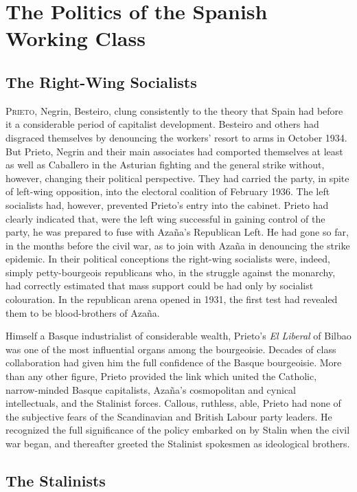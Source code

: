 \chapter{The Politics of the Spanish Working Class}

\section{The Right-Wing Socialists}

\textsc{Prieto}, Negrin, Besteiro, clung consistently to the theory that Spain had before it a considerable period of capitalist development. Besteiro and others had disgraced themselves by denouncing the workers’ resort to arms in October 1934. But Prieto, Negrin and their main associates had comported themselves at least as well as Caballero in the Asturian fighting and the general strike without, however, changing their political perspective. They had carried the party, in spite of left-wing opposition, into the electoral coalition of February 1936. The left socialists had, however, prevented Prieto’s entry into the cabinet. Prieto had clearly indicated that, were the left wing successful in gaining control of the party, he was prepared to fuse with Azaña’s Republican Left. He had gone so far, in the months before the civil war, as to join with Azaña in denouncing the strike epidemic. In their political conceptions the right-wing socialists were, indeed, simply petty-bourgeois republicans who, in the struggle against the monarchy, had correctly estimated that mass support could be had only by socialist colouration. In the republican arena opened in 1931, the first test had revealed them to be blood-brothers of Azaña.

Himself a Basque industrialist of considerable wealth, Prieto’s \emph{El Liberal} of Bilbao was one of the most influential organs among the bourgeoisie. Decades of class collaboration had given him the full confidence of the Basque bourgeoisie. More than any other figure, Prieto provided the link which united the Catholic, narrow-minded Basque capitalists, Azaña’s cosmopolitan and cynical intellectuals, and the Stalinist forces. Callous, ruthless, able, Prieto had none of the subjective fears of the Scandinavian and British Labour party leaders. He recognized the full significance of the policy embarked on by Stalin when the civil war began, and thereafter greeted the Stalinist spokesmen as ideological brothers.

\section{The Stalinists}

